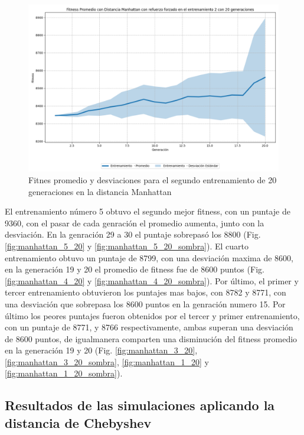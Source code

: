 \documentclass[conference]{IEEEtran}
\begin{document}
\begin{figure}[H]
    \centering
    \includegraphics[width=0.99\linewidth]{Manhattan/Fitness_Individual_20Gen/Fitness_2_Manh_20Gen_Sombra.png}
    \caption{Fitnes promedio y desviaciones para el segundo entrenamiento de 20 generaciones  en la distancia Manhattan}
    \label{fig:des_man_2}
\end{figure}

El entrenamiento número 5 obtuvo el segundo mejor fitness, con un puntaje de 9360, con el pasar de cada genración el promedio aumenta, junto con la desviación. En la genración 29 a 30 el puntaje sobrepasó los 8800 (Fig. \ref{fig:manhattan_5_20} y \ref{fig:manhattan_5_20_sombra}). El cuarto entrenamiento obtuvo un puntaje de 8799, con una desviación maxima de 8600, en la generación 19 y 20 el promedio de fitness fue de 8600 puntos (Fig. \ref{fig:manhattan_4_20} y \ref{fig:manhattan_4_20_sombra}). Por último, el primer y tercer entrenamiento obtuvieron los puntajes mas bajos, con 8782 y 8771, con una desviación que sobrepasa los 8600 puntos en la genración numero 15. Por último los peores puntajes fueron obtenidos por el tercer y primer entrenamiento, con un puntaje de 8771, y 8766 respectivamente, ambas superan una desviación de 8600 puntos, de igualmanera comparten una disminución del fitness promedio en la generación 19 y 20 (Fig. \ref{fig:manhattan_3_20}, \ref{fig:manhattan_3_20_sombra},  \ref{fig:manhattan_1_20} y \ref{fig:manhattan_1_20_sombra}).

\subsection{Resultados de las simulaciones aplicando la distancia de Chebyshev}
\end{document}
